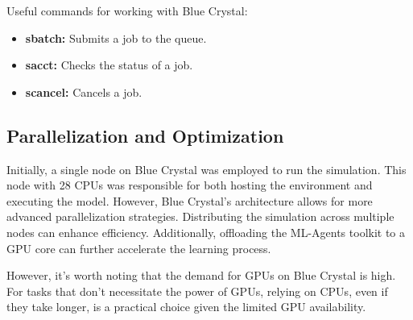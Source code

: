 Useful commands for working with Blue Crystal:

\begin{itemize}
    \item \textbf{sbatch:} Submits a job to the queue.
    \item \textbf{sacct:} Checks the status of a job.
    \item \textbf{scancel:} Cancels a job.
\end{itemize}

\subsection*{Parallelization and Optimization}

Initially, a single node on Blue Crystal was employed to run the simulation. This node with 28 CPUs was responsible for both hosting the environment and executing the model. However, Blue Crystal's architecture allows for more advanced parallelization strategies. Distributing the simulation across multiple nodes can enhance efficiency. Additionally, offloading the ML-Agents toolkit to a GPU core can further accelerate the learning process.

However, it's worth noting that the demand for GPUs on Blue Crystal is high. For tasks that don't necessitate the power of GPUs, relying on CPUs, even if they take longer, is a practical choice given the limited GPU availability.



